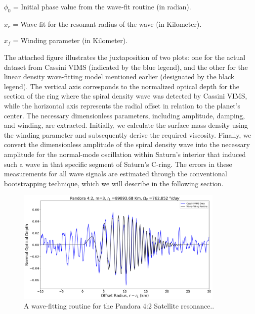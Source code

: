 \documentclass{article}
\begin{document}
\vspace{3pt}
\textbf{$\phi_{0}$} = Initial phase value from the wave-fit routine (in radian).

\vspace{3pt}
\textbf{$x_{r}$} = Wave-fit for the resonant radius of the wave (in Kilometer).

\vspace{3pt}
\textbf{$x_{f}$} = Winding parameter (in Kilometer).

\vspace{10pt}
The attached figure illustrates the juxtaposition of two plots: one for the actual dataset from Cassini VIMS (indicated by the blue legend), and the other for the linear density wave-fitting model mentioned earlier (designated by the black legend). The vertical axis corresponds to the normalized optical depth for the section of the ring where the spiral density wave was detected by Cassini VIMS, while the horizontal axis represents the radial offset in relation to the planet's center.
The necessary dimensionless parameters, including amplitude, damping, and winding, are extracted. Initially, we calculate the surface mass density using the winding parameter and subsequently derive the required viscosity. Finally, we convert the dimensionless amplitude of the spiral density wave into the necessary amplitude for the normal-mode oscillation within Saturn's interior that induced such a wave in that specific segment of Saturn's C-ring.
The errors in these measurements for all wave signals are estimated through the conventional bootstrapping technique, which we will describe in the following section.


\begin{figure}[h]
\centering 
\includegraphics[width=0.9\textwidth]{pandora_42_wavefit.png} 
\caption{A wave-fitting routine for the Pandora 4:2 Satellite resonance..} \label{fig:my_label}
\end{figure}
\end{document}
